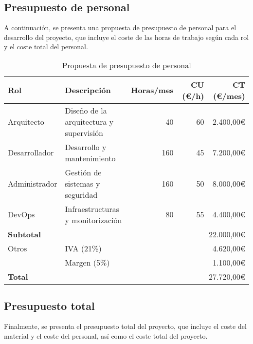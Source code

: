 \newpage{}
\subsection{Presupuesto de personal}\label{subsec:pres_personal}
A continuación, se presenta una propuesta de presupuesto de personal para el
desarrollo del proyecto, que incluye el coste de las horas de trabajo según
cada rol y el coste total del personal.

\begin{table}[H]
	\centering
	\small
	\begin{tabular}{|l|l|r|r|r|}
	\hline
	\textbf{Rol} & \textbf{Descripción} & \textbf{Horas/mes} & \textbf{CU (€/h)} & \textbf{CT (€/mes)} \\
	\hline
	\hline
	Arquitecto & Diseño de la arquitectura y supervisión & 40 & 60 & 2.400,00€ \\
	\hline
	Desarrollador & Desarrollo y mantenimiento & 160 & 45 & 7.200,00€ \\
	\hline
	Administrador & Gestión de sistemas y seguridad & 160 & 50 & 8.000,00€ \\
	\hline
	DevOps & Infraestructuras y monitorización & 80 & 55 & 4.400,00€ \\
	\hline
	\textbf{Subtotal} & \multicolumn{4}{r|}{22.000,00€} \\
	\hline
	\hline
	Otros & \multicolumn{3}{|l|}{IVA (21\%)} & 4.620,00€ \\
	 & \multicolumn{3}{|l|}{Margen (5\%)} & 1.100,00€ \\
	\hline
	\textbf{Total} & \multicolumn{4}{r|}{27.720,00€} \\
	\hline
	\end{tabular}
	\caption{Propuesta de presupuesto de personal}
	\label{tab:presupuesto_personal_aws}
\end{table}


\subsection{Presupuesto total}\label{subsec:pres_total}
Finalmente, se presenta el presupuesto total del proyecto, que incluye el coste
del material y el coste del personal, así como el coste total del proyecto.

